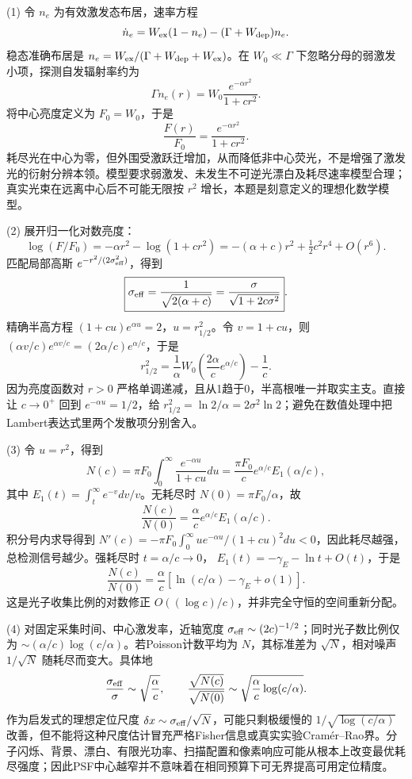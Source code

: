 (1) 令 \(n_e\) 为有效激发态布居，速率方程
\[
\dot n_e=W_{\rm ex}(1-n_e)-(\Gamma+W_{\rm dep})n_e.
\]
稳态准确布居是 \(n_e=W_{\rm ex}/(\Gamma+W_{\rm dep}+W_{\rm ex})\)。在 \(W_0\ll\Gamma\) 下忽略分母的弱激发小项，探测自发辐射率约为
\[
\Gamma n_e(r)=W_0\frac{e^{-\alpha r^2}}{1+cr^2}.
\]
将中心亮度定义为 \(F_0=W_0\)，于是
\[
\boxed{\frac{F(r)}{F_0}=\frac{e^{-\alpha r^2}}{1+cr^2}}.
\]
耗尽光在中心为零，但外围受激跃迁增加，从而降低非中心荧光，不是增强了激发光的衍射分辨本领。模型要求弱激发、未发生不可逆光漂白及耗尽速率模型合理；真实光束在远离中心后不可能无限按 \(r^2\) 增长，本题是刻意定义的理想化数学模型。

(2) 展开归一化对数亮度：
\[
\log(F/F_0)=-\alpha r^2-\log(1+cr^2)
=-(\alpha+c)r^2+\tfrac12c^2r^4+O(r^6).
\]
匹配局部高斯 \(e^{-r^2/(2\sigma_{\rm eff}^2)}\)，得到
\[
\boxed{\sigma_{\rm eff}=\frac1{\sqrt{2(\alpha+c)}}=
\frac{\sigma}{\sqrt{1+2c\sigma^2}}}.
\]
精确半高方程 \((1+cu)e^{\alpha u}=2\)，\(u=r_{1/2}^2\)。令 \(v=1+cu\)，则 \((\alpha v/c)e^{\alpha v/c}=(2\alpha/c)e^{\alpha/c}\)，于是
\[
\boxed{r_{1/2}^2=\frac1\alpha W_0\left(\frac{2\alpha}{c}e^{\alpha/c}\right)-\frac1c}.
\]
因为亮度函数对 \(r>0\) 严格单调递减，且从1趋于0，半高根唯一并取实主支。直接让 \(c\to0^+\) 回到 \(e^{-\alpha u}=1/2\)，给 \(r_{1/2}^2=\ln2/\alpha=2\sigma^2\ln2\)；避免在数值处理中把Lambert表达式里两个发散项分别舍入。

(3) 令 \(u=r^2\)，得到
\[
N(c)=\pi F_0\int_0^\infty\frac{e^{-\alpha u}}{1+cu}du
=\boxed{\frac{\pi F_0}{c}e^{\alpha/c}E_1(\alpha/c)},
\]
其中 \(E_1(t)=\int_t^\infty e^{-v}dv/v\)。无耗尽时 \(N(0)=\pi F_0/\alpha\)，故
\[
\boxed{\frac{N(c)}{N(0)}=\frac{\alpha}{c}e^{\alpha/c}E_1(\alpha/c)}.
\]
积分号内求导得到
\(N'(c)=-\pi F_0\int_0^\infty u e^{-\alpha u}/(1+cu)^2du<0\)，因此耗尽越强，总检测信号越少。强耗尽时 \(t=\alpha/c\to0\)，
\(E_1(t)=-\gamma_E-\ln t+O(t)\)，于是
\[
\frac{N(c)}{N(0)}=
\frac{\alpha}{c}\left[\ln(c/\alpha)-\gamma_E+o(1)\right].
\]
这是光子收集比例的对数修正 \(O((\log c)/c)\)，并非完全守恒的空间重新分配。

(4) 对固定采集时间、中心激发率，近轴宽度 \(\sigma_{\rm eff}\sim (2c)^{-1/2}\)；同时光子数比例仅为 \(\sim(\alpha/c)\log(c/\alpha)\)。若Poisson计数平均为 \(N\)，其标准差为 \(\sqrt N\)，相对噪声 \(1/\sqrt N\) 随耗尽而变大。具体地
\[
\frac{\sigma_{\rm eff}}{\sigma}\sim\sqrt{\frac{\alpha}{c}},\qquad
\frac{\sqrt{N(c)}}{\sqrt{N(0)}}\sim
\sqrt{\frac{\alpha}{c}\log(c/\alpha)}.
\]
作为启发式的理想定位尺度 \(\delta x\sim\sigma_{\rm eff}/\sqrt N\)，可能只剩极缓慢的 \(1/\sqrt{\log(c/\alpha)}\) 改善，但不能将这种尺度估计冒充严格Fisher信息或真实实验Cramér--Rao界。分子闪烁、背景、漂白、有限光功率、扫描配置和像素响应可能从根本上改变最优耗尽强度；因此PSF中心越窄并不意味着在相同预算下可无界提高可用定位精度。